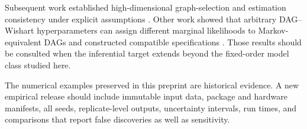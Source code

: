 \documentclass[12pt]{article}
\theoremstyle{plain}
\theoremstyle{definition}
\theoremstyle{remark}
\begin{document}
Subsequent work established high-dimensional graph-selection and
estimation consistency under explicit assumptions
\cite{CaoKhareGhosh2019}.  Other work showed that arbitrary
DAG--Wishart hyperparameters can assign different marginal likelihoods
to Markov-equivalent DAGs and constructed compatible specifications
\cite{PelusoConsonni2020}.  Those results should be consulted when the
inferential target extends beyond the fixed-order model class studied
here.

The numerical examples preserved in this preprint are historical
evidence.  A new empirical release should include immutable input data,
package and hardware manifests, all seeds, replicate-level outputs,
uncertainty intervals, run times, and comparisons that report false
discoveries as well as sensitivity.

\end{document}
